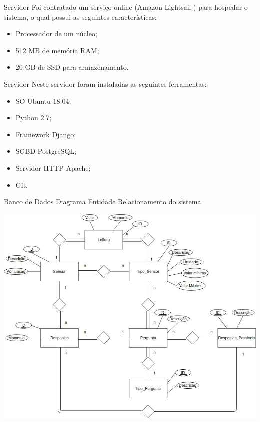 \documentclass{beamer}
\begin{document}
  \begin{frame}{Servidor}
    \quad Foi contratado um serviço online (Amazon Lightsail \cite{lightsail}) para hospedar o sistema, o qual possui as seguintes características:
    \begin{itemize}
      \item Processador de um núcleo;
      \item 512 MB de memória RAM;
      \item 20 GB de SSD para armazenamento.
    \end{itemize}
  \end{frame}
  \begin{frame}{Servidor}
    \quad Neste servidor foram instaladas as seguintes ferramentas:
    \begin{itemize}
      \item SO Ubuntu 18.04;
      \item Python 2.7;
      \item Framework Django;
      \item SGBD PostgreSQL;
      \item Servidor HTTP Apache;
      \item Git.
    \end{itemize}
  \end{frame}

  \begin{frame}{Banco de Dados}
    \quad Diagrama Entidade Relacionamento do sistema
    \begin{center}
    \includegraphics[scale=0.3]{tccDER}
    \end{center}
  \end{frame}
\end{document}
